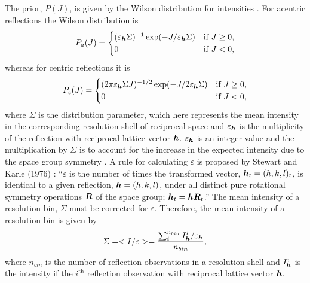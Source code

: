 The prior, $P(J)$, is given by the Wilson distribution for intensities \cite{wilson1949probability}.
For acentric reflections the Wilson distribution is
\begin{equation}
    P_a(J) =
    \begin{cases}
        (\varepsilon_{\boldsymbol{h}}\Sigma)^{-1} \exp(-J/\varepsilon_{\boldsymbol{h}}\Sigma) & \mbox{if } J \ge 0, \\
        0                           & \mbox{if } J < 0,
    \end{cases}
    \label{eq:Wilson Distribution for acentric reflections - Intensities}
\end{equation}
whereas for centric reflections it is
\begin{equation}
    P_c(J) =
    \begin{cases}
        (2\pi\varepsilon_{\boldsymbol{h}}\Sigma J)^{-1/2} \exp(-J/2\varepsilon_{\boldsymbol{h}}\Sigma) & \mbox{if } J \ge 0, \\
        0                                      & \mbox{if } J < 0,
    \end{cases}
    \label{eq:Wilson Distribution for centric reflections - Intensities}
\end{equation}
where $\Sigma$ is the distribution parameter, which here represents the mean intensity in the corresponding resolution shell of reciprocal space and $\varepsilon_{\boldsymbol{h}}$ is the multiplicity of the reflection with reciprocal lattice vector $\boldsymbol{h}$. $\varepsilon_{\boldsymbol{h}}$ is an integer value and the multiplication by $\Sigma$ is to account for the increase in the expected intensity due to the space group symmetry \cite{blessing1998intensity}. A rule for calculating $\varepsilon$ is proposed by Stewart and Karle (1976) \cite{stewart1976}: ``$\varepsilon$ is the number of times the transformed vector, $\boldsymbol{h}_t = (h,k,l)_t$, is identical to a given reflection, $\boldsymbol{h} = (h,k,l)$, under all distinct pure rotational symmetry operations $\boldsymbol{R}$ of the space group; $\boldsymbol{h}_t = \boldsymbol{h}\boldsymbol{R}_t$.''
The mean intensity of a resolution bin, $\Sigma$ must be corrected for $\varepsilon$.
Therefore, the mean intensity of a resolution bin is given by
\begin{equation}
    \Sigma = <I/\varepsilon> = \frac{\sum^{n_{bin}}_i I^i_{\boldsymbol{h}}/\varepsilon_{\boldsymbol{h}}}{n_{bin}},
    \label{eq:Mean intensity of resolution bin}
\end{equation}
where $n_{bin}$ is the number of reflection observations in a resolution shell and $I^i_{\boldsymbol{h}}$ is the intensity if the $i^{\text{th}}$ reflection observation with reciprocal lattice vector $\boldsymbol{h}$.

